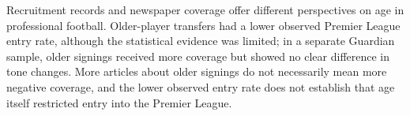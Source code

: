 Recruitment records and newspaper coverage offer different perspectives on age in professional football. Older-player transfers had a lower observed Premier League entry rate, although the statistical evidence was limited; in a separate Guardian sample, older signings received more coverage but showed no clear difference in tone changes. More articles about older signings do not necessarily mean more negative coverage, and the lower observed entry rate does not establish that age itself restricted entry into the Premier League.
